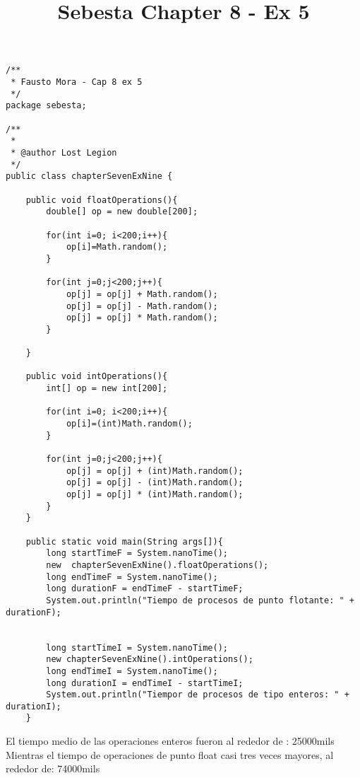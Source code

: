 \documentclass{article}
\begin{document}
\lstset{language=JAva}          %
\title{Sebesta Chapter 8 - Ex 5}
\begin{lstlisting}[frame=single]  % Start your code-block
/**
 * Fausto Mora - Cap 8 ex 5
 */
package sebesta;

/**
 *
 * @author Lost Legion
 */
public class chapterSevenExNine {
    
    public void floatOperations(){
        double[] op = new double[200];
        
        for(int i=0; i<200;i++){
            op[i]=Math.random();
        }
        
        for(int j=0;j<200;j++){
            op[j] = op[j] + Math.random();
            op[j] = op[j] - Math.random();
            op[j] = op[j] * Math.random();
        }
    
    }
    
    public void intOperations(){
        int[] op = new int[200];
        
        for(int i=0; i<200;i++){
            op[i]=(int)Math.random();
        }
        
        for(int j=0;j<200;j++){
            op[j] = op[j] + (int)Math.random();
            op[j] = op[j] - (int)Math.random();
            op[j] = op[j] * (int)Math.random();
        }
    }
    
    public static void main(String args[]){
        long startTimeF = System.nanoTime();
        new  chapterSevenExNine().floatOperations();
        long endTimeF = System.nanoTime();
        long durationF = endTimeF - startTimeF;
        System.out.println("Tiempo de procesos de punto flotante: " + durationF);


        long startTimeI = System.nanoTime();
        new chapterSevenExNine().intOperations();
        long endTimeI = System.nanoTime();
        long durationI = endTimeI - startTimeI;
        System.out.println("Tiempor de procesos de tipo enteros: " + durationI);
    }

\end{lstlisting}
El tiempo medio de las operaciones enteros fueron al rededor de : 25000mils
\\ Mientras el tiempo de operaciones de punto float casi tres veces mayores, al rededor de: 74000mils
\end{document}

